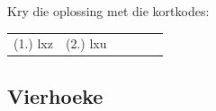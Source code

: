\begin{exercises}{}
\par {} Kry die oplossing met die kortkodes:
 \par \begin{tabular}[h]{cccccc}
 (1.) lxz  &  (2.) lxu  & \end{tabular}
\end{exercises}

\subsection{Vierhoeke}
\nopagebreak
{}
\begin{center}


\end{center}
